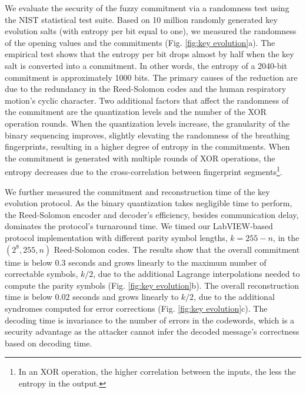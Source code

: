 We evaluate the security of the fuzzy commitment via a randomness test using the NIST statistical test suite. Based on 10 million randomly generated key evolution salts (with entropy per bit equal to one), we measured the randomness of the opening values and the commitments (Fig. \ref{fig:key evolution}a). The empirical test shows that the entropy per bit drops almost by half when the key salt is converted into a commitment. In other words, the entropy of a 2040-bit commitment is approximately 1000 bits. The primary causes of the reduction are due to the redundancy in the Reed-Solomon codes and the human respiratory motion's cyclic character. Two additional factors that affect the randomness of the commitment are the quantization levels and the number of the XOR operation rounds. When the quantization levels increase, the granularity of the binary sequencing improves, slightly elevating the randomness of the breathing fingerprints, resulting in a higher degree of entropy in the commitments. When the commitment is generated with multiple rounds of XOR operations, the entropy decreases due to the cross-correlation between fingerprint segments\footnote{In an XOR operation, the higher correlation between the inputs, the less the entropy in the output.}.

We further measured the commitment and reconstruction time of the key evolution protocol. As the binary quantization takes negligible time to perform, the Reed-Solomon encoder and decoder's efficiency, besides communication delay,  dominates the protocol's turnaround time. We timed our LabVIEW-based protocol implementation with different parity symbol lengths, $k = 255 - n$, in the $(2^{8}, 255, n)$ Reed-Solomon codes. The results show that the overall commitment time is below 0.3 seconds and grows linearly to the maximum number of correctable symbols, $k/2$, due to the additional Lagrange interpolations needed to compute the parity symbols (Fig. \ref{fig:key evolution}b). The overall reconstruction time is below 0.02 seconds and grows linearly to $k/2$, due to the additional syndromes computed for error corrections (Fig. \ref{fig:key evolution}c). The decoding time is invariance to the number of errors in the codewords, which is a security advantage as the attacker cannot infer the decoded message's correctness based on decoding time.


